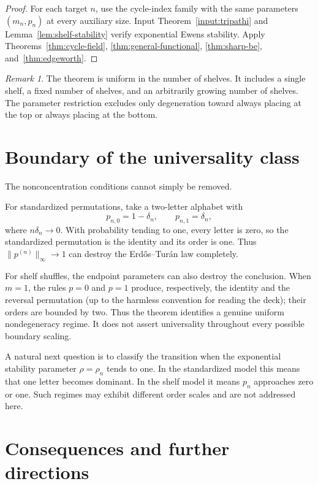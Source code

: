 \documentclass[11pt]{article}
\theoremstyle{definition}
\theoremstyle{remark}
\newtheorem{remark}[theorem]{Remark}
\begin{document}
\begin{proof}
For each target $n$, use the cycle-index family with the same parameters
$(m_n,p_n)$ at every auxiliary size.  Input
Theorem~\ref{input:tripathi} and
Lemma~\ref{lem:shelf-stability} verify exponential Ewens stability.
Apply Theorems~\ref{thm:cycle-field},
\ref{thm:general-functional}, \ref{thm:sharp-be}, and~\ref{thm:edgeworth}.
\end{proof}

\begin{remark}
The theorem is uniform in the number of shelves.  It includes a single
shelf, a fixed number of shelves, and an arbitrarily growing number of
shelves.  The parameter restriction excludes only degeneration toward
always placing at the top or always placing at the bottom.
\end{remark}

\section{Boundary of the universality class}

The nonconcentration conditions cannot simply be removed.

For standardized permutations, take a two-letter alphabet with
\[
 p_{n,0}=1-\delta_n,\qquad p_{n,1}=\delta_n,
\]
where $n\delta_n\to0$.  With probability tending to one, every letter is
zero, so the standardized permutation is the identity and its order is
one.  Thus $\|p^{(n)}\|_\infty\to1$ can destroy the Erd\H{o}s--Tur\'an
law completely.

For shelf shuffles, the endpoint parameters can also destroy the
conclusion.  When $m=1$, the rules $p=0$ and $p=1$ produce, respectively,
the identity and the reversal permutation (up to the harmless convention
for reading the deck); their orders are bounded by two.  Thus the theorem
identifies a genuine uniform nondegeneracy regime.  It does not assert
universality throughout every possible boundary scaling.

A natural next question is to classify the transition when the exponential
stability parameter $\rho=\rho_n$ tends to one.  In the standardized model
this means that one letter becomes dominant.  In the shelf model it means
$p_n$ approaches zero or one.  Such regimes may exhibit different order
scales and are not addressed here.

\section{Consequences and further directions}
\end{document}
